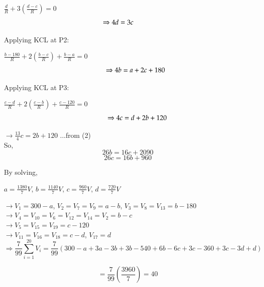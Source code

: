 \documentclass[11pt,a4paper]{scrartcl}
\begin{document}
\begin{solution}
\hspace{7.5cm}$\frac{d}{R}+3\left(\frac{d-c}{R}\right)=0$
\begin{equation*}
   \hspace{-1cm} \Rightarrow 4d=3c
\end{equation*}

Applying KCL at P2:

\hspace{7.5cm} $\frac{b-180}{R}+2\left(\frac{b-c}{R}\right)+\frac{b-a}{R}=0$
\begin{equation*}
    \hspace{0.8cm}\Rightarrow 4b=a+2c+180
\end{equation*}

Applying KCL at P3:

\hspace{7.5cm}$\frac{c-d}{R}+2\left(\frac{c-b}{R}\right)+\frac{c-120}{R}=0$
\begin{equation*}
    \hspace{0.95cm}\Rightarrow 4c=d+2b+120
\end{equation*}

\hspace{6cm}$\rightarrow\frac{13}{4}c=2b+120$ \hspace{1cm}...from (2)\\

So, 
$$26b=16c+2090$$
$$26c=16b+960$$


By solving, 

\hspace{7cm}$a=\frac{1380}{7}V$, $b=\frac{1140}{7}V$, $c=\frac{960}{7}V$, $d=\frac{720}{7}V$\\
\vspace{1cm}

$\rightarrow V_1=300-a$, $V_2=V_7=V_9=a-b$, $V_3=V_8=V_{13}=b-180$\\

$\rightarrow V_4=V_{10}=V_6=V_{12}=V_{14}=V_2=b-c$\\

$\rightarrow V_5=V_{15}=V_{19}=c-120$\\

$\rightarrow V_{11}=V_{16}=V_{18}=c-d$, $V_{17}=d$\\
\pagebreak 
$$\Rightarrow \frac{7}{99}\sum_{i=1}^{20} V_i=\frac{7}{99}(300-a+3a-3b+3b-540+6b-6c+3c-360+3c-3d+d)$$

$$=\frac{7}{99}\left(\frac{3960}{7}\right)=40$$
\end{solution}
\vspace{10mm}%
\end{document}
